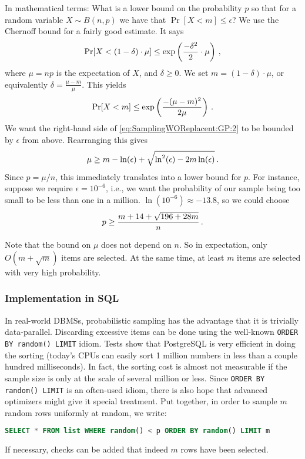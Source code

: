\documentclass[letterpaper,11pt]{scrreprt}
\numberwithin{equation}{section}
\newcommand{\SiM}{\mathchoice{\,}{}{}{}}
\theoremstyle{algorithm}
\begin{document}
In mathematical terms: What is a lower bound on the probability $p$ so that for a random variable $X \sim B(n,p)$ we have that $\Pr[X < m] \leq \epsilon$? We use the Chernoff bound for a fairly good estimate. It says
%
\begin{align*}
	\Pr[X < (1 - \delta) \cdot \mu] \leq \exp\left( \frac{-\delta^2}{2} \cdot \mu \right)
	\SiM,
\end{align*}
where $\mu = np$ is the expectation of $X$, and $\delta \geq 0$. We set $m = (1 - \delta) \cdot \mu$, or equivalently $\delta = \frac{\mu - m}{\mu}$.
%
This yields
\begin{align}
	\Pr[X < m] \leq \exp\left( \frac{-(\mu - m)^2}{2 \mu} \right)
	\SiM. \label{eq:SamplingWOReplacent:GP:2}
\end{align}
%
We want the right-hand side of \eqref{eq:SamplingWOReplacent:GP:2} to be bounded by $\epsilon$ from above. Rearranging this gives
\begin{align*}
	\mu \geq m - \ln(\epsilon) + \sqrt{\ln^2(\epsilon) - 2 m \ln(\epsilon)}
	\SiM.
\end{align*}
Since $p = \mu / n$, this immediately translates into a lower bound for $p$. For instance, suppose we require $\epsilon = 10^{-6}$, i.e., we want the probability of our sample being too small to be less than one in a million. $\ln(10^{-6}) \approx -13.8$, so we could choose
\begin{align*}
	p \geq \frac{m + 14 + \sqrt{196 + 28m}}{n}
	\SiM.
\end{align*}

Note that the bound on $\mu$ does not depend on $n$. So in expectation, only $O(m + \sqrt m)$ items are selected. At the same time, at least $m$ items are selected with very high probability.

\subsubsection{Implementation in SQL}

In real-world DBMSs, probabilistic sampling has the advantage that it is trivially data-parallel. Discarding excessive items can be done using the well-known \texttt{ORDER BY random() LIMIT} idiom. Tests show that PostgreSQL is very efficient in doing the sorting (today's CPUs can easily sort 1 million numbers in less than a couple hundred milliseconds). In fact, the sorting cost is almost not measurable if the sample size is only at the scale of several million or less. Since \texttt{ORDER BY random() LIMIT} is an often-used idiom, there is also hope that advanced optimizers might give it special treatment. Put together, in order to sample $m$ random rows uniformly at random, we write:
\begin{lstlisting}[language=SQL]
	SELECT * FROM list WHERE random() < p ORDER BY random() LIMIT m
\end{lstlisting}
If necessary, checks can be added that indeed $m$ rows have been selected.
\end{document}
